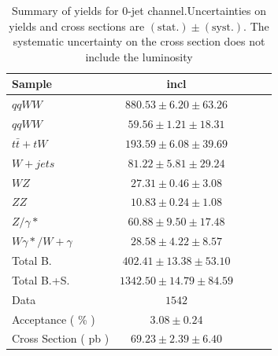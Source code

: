 \begin{table}[!ht]
{\small
\begin{center}
\begin{tabular}{|l|c|c|c|c|}
\hline
Sample  & incl  \\ \hline
$qqWW$  & $880.53 \pm 6.20 \pm 63.26 $  \\
$qqWW$  & $59.56 \pm 1.21 \pm 18.31 $   \\
$t\bar{t} + tW$ & $193.59 \pm 6.08 \pm 39.69 $  \\
$W+jets$    & $81.22 \pm 5.81 \pm 29.24 $   \\
$WZ$    & $27.31 \pm 0.46 \pm 3.08 $    \\
$ZZ$    & $10.83 \pm 0.24 \pm 1.08 $    \\
$Z/\gamma*$ & $60.88 \pm 9.50 \pm 17.48 $   \\
$W\gamma*/W+\gamma$ & $28.58 \pm 4.22 \pm 8.57 $    \\
\hline \hline
Total B.    & $402.41 \pm 13.38 \pm 53.10 $ \\ \hline \hline
Total B.+S. & $1342.50 \pm 14.79 \pm 84.59 $    \\ \hline \hline
Data    & $1542$    \\ \hline \hline
Acceptance ( \% )   & $3.08 \pm 0.24    $\\
Cross Section ( pb )    & $69.23 \pm 2.39 \pm 6.40$     \\ \hline
\end{tabular}
\caption{Summary of yields for 0-jet channel.Uncertainties on yields and cross sections are $\mathrm{(stat.)} \pm \mathrm{(syst.)}$. The systematic uncertainty on the cross section does not include the luminosity}
\label{tab:datayields_wwxsec_0j_incl}
\end{center}}
\end{table}

